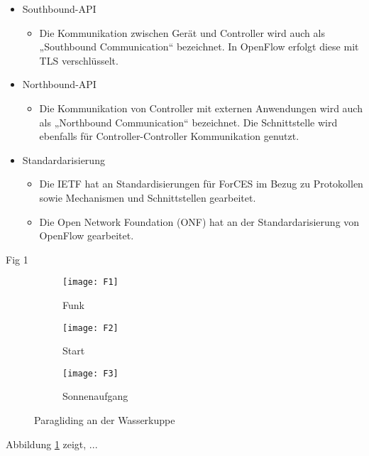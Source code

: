 \documentclass[twoside,12pt]{scrartcl}
\begin{document}
\begin{itemize}
\begin{itemize}
		\end{itemize}
		\item Southbound-API
		\begin{itemize}
			\item Die Kommunikation zwischen Gerät und Controller wird auch als „Southbound Communication“ bezeichnet. In OpenFlow erfolgt diese mit TLS verschlüsselt.
		\end{itemize}
		\item Northbound-API
		\begin{itemize}
			\item Die Kommunikation von Controller mit externen Anwendungen  wird auch als „Northbound Communication“ bezeichnet. Die Schnittstelle wird ebenfalls für Controller-Controller Kommunikation genutzt.
		\end{itemize}
		\item Standardarisierung
		\begin{itemize}
			\item Die IETF hat an Standardisierungen für ForCES im Bezug zu Protokollen sowie Mechanismen und Schnittstellen gearbeitet.
			\item Die Open Network Foundation (ONF) hat an der Standardarisierung von OpenFlow gearbeitet.
		\end{itemize}
	\end{itemize}

Fig 1

\begin{figure}
	\centering
	\begin{subfigure}[t]{.3\linewidth}
		\texttt{[image: F1]}
		\caption{Funk}
		\label{fig:sub1}
	\end{subfigure}%
	\hfill
	\begin{subfigure}[t]{.3\linewidth}
		\texttt{[image: F2]}
		\caption{Start}
		\label{fig:sub2}
	\end{subfigure}
	\hfill
	\begin{subfigure}[t]{.3\linewidth}
		\texttt{[image: F3]}
		\caption{Sonnenaufgang}
		\label{fig:sub3}
	\end{subfigure}%
	\caption{Paragliding an der Wasserkuppe}
	\label{fig:paragliding}
\end{figure}
	
	\vspace{1cm}
	
	Abbildung \ref{fig:sub1} zeigt, ...
	
	
	\vspace{1cm}
	
\end{document}
